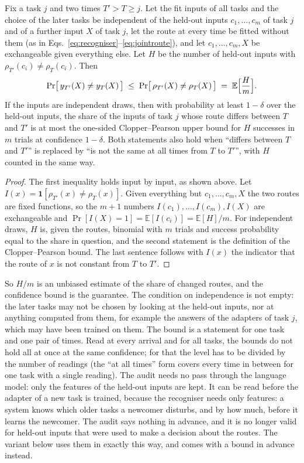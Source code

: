 \begin{proposition}
\label{prop:audit}
Fix a task $j$ and two times $T' > T \ge j$. Let the fit inputs of all tasks and the choice of the
later tasks be independent of the held-out inputs $c_1, \dots, c_m$ of task $j$ and of a further
input $X$ of task $j$, let the route at every time be fitted without them (as in
Eqs.~\eqref{eq:recogniser}--\eqref{eq:jointroute}), and let $c_1, \dots, c_m, X$ be exchangeable
given everything else. Let $H$ be the number of held-out inputs with
$\rho_{T'}(c_i) \ne \rho_T(c_i)$. Then
\[
  \Pr\bigl[\, y_{T'}(X) \ne y_T(X) \,\bigr] \;\le\; \Pr\bigl[\, \rho_{T'}(X) \ne \rho_T(X) \,\bigr]
  \;=\; \mathbb{E}\Bigl[\frac{H}{m}\Bigr] .
\]
If the inputs are independent draws, then with probability at least $1 - \delta$ over the held-out
inputs, the share of the inputs of task $j$ whose route differs between $T$ and $T'$ is at most
the one-sided Clopper--Pearson upper bound for $H$ successes in $m$ trials at confidence
$1 - \delta$. Both statements also hold when ``differs between $T$ and $T'$'' is replaced by ``is
not the same at all times from $T$ to $T'$'', with $H$ counted in the same way.
\end{proposition}

\begin{proof}
The first inequality holds input by input, as shown above. Let
$I(x) = \mathbf{1}[\rho_{T'}(x) \ne \rho_T(x)]$. Given everything but $c_1, \dots, c_m, X$ the two
routes are fixed functions, so the $m + 1$ numbers $I(c_1), \dots, I(c_m), I(X)$ are exchangeable
and $\Pr[I(X) = 1] = \mathbb{E}[I(c_i)] = \mathbb{E}[H]/m$. For independent draws, $H$ is, given
the routes, binomial with $m$ trials and success probability equal to the share in question, and
the second statement is the definition of the Clopper--Pearson bound. The last sentence follows
with $I(x)$ the indicator that the route of $x$ is not constant from $T$ to $T'$.
\end{proof}

So $H/m$ is an unbiased estimate of the share of changed routes, and the confidence bound is the
guarantee. The condition on independence is not empty: the later tasks may not be chosen by
looking at the held-out inputs, nor at anything computed from them, for example the answers of the
adapters of task $j$, which may have been trained on them. The bound is a statement for one task
and one pair of times. Read at every arrival and for all tasks, the bounds do not hold all at
once at the same confidence; for that the level has to be divided by the number of readings (the
``at all times'' form covers every time in between for one task with a single reading). The audit
needs no pass through the language model: only the features of the held-out inputs are kept. It
can be read before the adapter of a new task is trained, because the recogniser needs only
features: a system knows which older tasks a newcomer disturbs, and by how much, before it learns
the newcomer. The audit says nothing in advance, and it is no longer valid for held-out inputs
that were used to make a decision about the routes. The variant below uses them in exactly this way,
and comes with a bound in advance instead.


